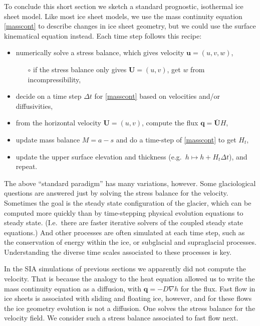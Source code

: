 \documentclass[titlepage,a4paper,final,12pt]{scrartcl}
\newcommand{\bq}{\mathbf{q}}
\newcommand{\bU}{\mathbf{U}}
\begin{document}
To conclude this short section we sketch a standard prognostic, isothermal ice sheet model.  Like most ice sheet models, we use the mass continuity equation \eqref{masscont} to describe changes in ice sheet geometry, but we could use the surface kinematical equation instead.  Each time step follows this recipe:
  \begin{itemize}
  \item numerically solve a stress balance, which gives velocity $\mathbf{u}=(u,v,w)$,
    \begin{itemize}
    \item[$\circ$] if the stress balance only gives $\mathbf{U}=(u,v)$, get $w$ from incompressibility,
    \end{itemize}
  \item decide on a time step $\Delta t$ for \eqref{masscont} based on velocities and/or diffusivities,
  \item from the horizontal velocity $\mathbf{U}=(u,v)$, compute the flux $\bq = \bar{\bU} H$,
  \item update mass balance $M=a-s$ and do a time-step of \eqref{masscont} to get $H_t$,
  \item update the upper surface elevation and thickness (e.g.~$h \mapsto h + H_t \Delta t$), and repeat.
  \end{itemize}

The above ``standard paradigm'' has many variations, however.  Some glaciological questions are answered just by solving the stress balance for the velocity.  Sometimes the goal is the steady state configuration of the glacier, which can be computed more quickly than by time-stepping physical evolution equations to steady state.  (I.e.~there are faster iterative solvers of the coupled steady state equations.)  And other processes are often simulated at each time step, such as the conservation of energy within the ice, or subglacial and supraglacial processes.  Understanding the diverse time scales associated to these processes is key.

In the SIA simulations of previous sections we apparently did not compute the velocity.  That is because the analogy to the heat equation allowed us to write the mass continuity equation as a diffusion, with $\bq=-D\nabla h$ for the flux.  Fast flow in ice sheets is associated with sliding and floating ice, however, and for these flows the ice geometry evolution is not a diffusion.  One solves the stress balance for the velocity field.  We consider such a stress balance associated to fast flow next.
\end{document}
